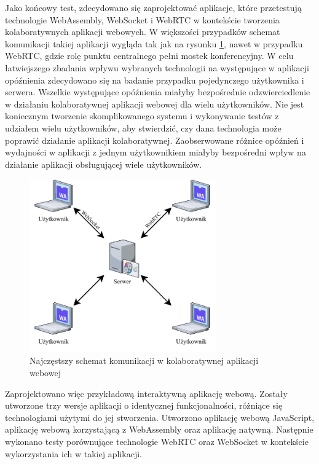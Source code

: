 \documentclass[language=polish,type=master]{aghmodern}
\begin{document}
Jako końcowy test, zdecydowano się zaprojektować aplikacje, które przetestują technologie WebAssembly, WebSocket i WebRTC w kontekście tworzenia kolaboratywnych aplikacji webowych.
W większości przypadków schemat komunikacji takiej aplikacji wygląda tak jak na rysunku \ref{fig:collaboration}, nawet w przypadku WebRTC, gdzie rolę punktu centralnego pełni mostek konferencyjny.
W celu łatwiejszego zbadania wpływu wybranych technologii na występujące w aplikacji opóźnienia zdecydowano się na badanie przypadku pojedynczego użytkownika i serwera.
Wszelkie występujące opóźnienia miałyby bezpośrednie odzwierciedlenie w działaniu kolaboratywnej aplikacji webowej dla wielu użytkowników.
Nie jest koniecznym tworzenie skomplikowanego systemu i wykonywanie testów z udziałem wielu użytkowników, aby stwierdzić, czy dana technologia może poprawić działanie aplikacji kolaboratywnej.
Zaobserwowane różnice opóźnień i wydajności w aplikacji z jednym użytkownikiem miałyby bezpośredni wpływ na działanie aplikacji obsługującej wiele użytkowników.

\begin{figure}[H]
    \centering
    \vspace*{15pt}
    \includegraphics[width=0.717\textwidth]{images/collaboration.pdf} %
    \caption{Najczęstszy schemat komunikacji w kolaboratywnej aplikacji webowej}
    \label{fig:collaboration}
\end{figure}

Zaprojektowano więc przykładową interaktywną aplikację webową.
Zostały utworzone trzy wersje aplikacji o identycznej funkcjonalności, różniące się technologiami użytymi do jej stworzenia.
Utworzono aplikację webową JavaScript, aplikację webową korzystającą z WebAssembly oraz aplikację natywną.
Następnie wykonano testy porównujące technologie WebRTC oraz WebSocket w kontekście wykorzystania ich w takiej aplikacji.
\end{document}
